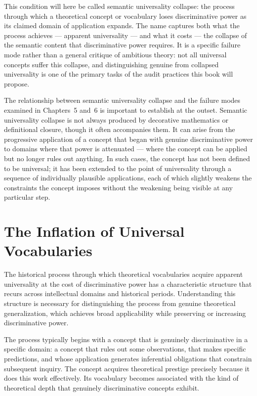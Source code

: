 \documentclass[12pt, openright, twoside]{book}
\begin{document}
This condition will here be called semantic universality
collapse: the process through which a theoretical concept
or vocabulary loses discriminative power as its claimed
domain of application expands. The name captures both what
the process achieves --- apparent universality --- and what
it costs --- the collapse of the semantic content that
discriminative power requires. It is a specific failure
mode rather than a general critique of ambitious theory:
not all universal concepts suffer this collapse, and
distinguishing genuine from collapsed universality is
one of the primary tasks of the audit practices this
book will propose.

The relationship between semantic universality collapse
and the failure modes examined in Chapters~5 and~6
is important to establish at the outset. Semantic
universality collapse is not always produced by decorative
mathematics or definitional closure, though it often
accompanies them. It can arise from the progressive
application of a concept that began with genuine
discriminative power to domains where that power is
attenuated --- where the concept can be applied but
no longer rules out anything. In such cases, the
concept has not been defined to be universal; it has
been extended to the point of universality through
a sequence of individually plausible applications,
each of which slightly weakens the constraints the
concept imposes without the weakening being visible
at any particular step.

\section{The Inflation of Universal Vocabularies}

The historical process through which theoretical vocabularies
acquire apparent universality at the cost of discriminative
power has a characteristic structure that recurs across
intellectual domains and historical periods. Understanding
this structure is necessary for distinguishing the process
from genuine theoretical generalization, which achieves
broad applicability while preserving or increasing
discriminative power.

The process typically begins with a concept that is
genuinely discriminative in a specific domain: a concept
that rules out some observations, that makes specific
predictions, and whose application generates inferential
obligations that constrain subsequent inquiry. The
concept acquires theoretical prestige precisely because
it does this work effectively. Its vocabulary becomes
associated with the kind of theoretical depth that
genuinely discriminative concepts exhibit.
\end{document}
